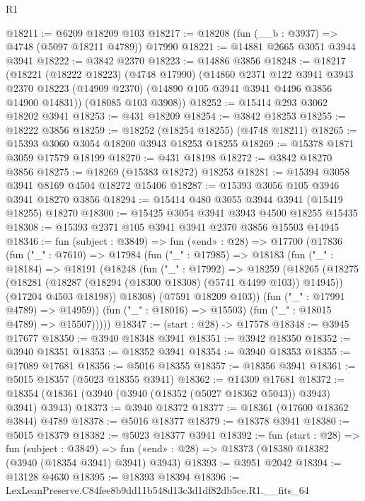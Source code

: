 \begin{lexlean}{R1}
\begin{coremodule}
@18211 := @6209 @18209 @103
@18217 := @18208 (fun (__b : @3937) => @4748 (@5097 @18211 @4789)) @17990
@18221 := @14881 @2665 @3051 @3944 @3941
@18222 := @3842 @2370
@18223 := @14886 @3856
@18248 := @18217
    (@18221
      (@18222 @18223)
      (@4748 @17990)
      (@14860
        @2371
        @122
        @3941
        @3943
        @2370
        @18223
        (@14909 @2370)
        (@14890 @105 @3941 @3941 @4496 @3856 @14900 @14831))
      (@18085 @103 @3908))
@18252 := @15414 @293 @3062 @18202 @3941
@18253 := @431 @18209
@18254 := @3842 @18253
@18255 := @18222 @3856
@18259 := @18252 (@18254 @18255) (@4748 @18211)
@18265 := @15393 @3060 @3054 @18200 @3943 @18253 @18255
@18269 := @15378 @1871 @3059 @17579 @18199
@18270 := @431 @18198
@18272 := @3842 @18270 @3856
@18275 := @18269 (@15383 @18272) @18253
@18281 := @15394 @3058 @3941 @8169 @4504 @18272 @15406
@18287 := @15393 @3056 @105 @3946 @3941 @18270 @3856
@18294 := @15414 @480 @3055 @3944 @3941 (@15419 @18255) @18270
@18300 := @15425 @3054 @3941 @3943 @4500 @18255 @15435
@18308 := @15393 @2371 @105 @3941 @3941 @2370 @3856 @15503 @14945
@18346 := fun (subject : @3849) =>
  fun («end» : @28) =>
  @17700
    (@17836
      (fun ("_" : @7610) =>
      @17984
        (fun ("_" : @17985) =>
        @18183
          (fun ("_" : @18184) =>
          @18191
            (@18248
              (fun ("_" : @17992) =>
              @18259
                (@18265
                  (@18275
                    (@18281 (@18287 (@18294 (@18300 @18308) (@5741 @4499 @103)) @14945))
                    (@17204 @4503 @18198))
                  @18308)
                (@7591 @18209 @103))
              (fun ("_" : @17991 @4789) => @14959))
            (fun ("_" : @18016) => @15503)
            (fun ("_" : @18015 @4789) => @15507)))))
@18347 := (start : @28) -> @17578
@18348 := @3945 @17677
@18350 := @3940 @18348 @3941
@18351 := @3942 @18350
@18352 := @3940 @18351
@18353 := @18352 @3941
@18354 := @3940 @18353
@18355 := @17089 @17681
@18356 := @5016 @18355
@18357 := @18356 @3941
@18361 := @5015 @18357 (@5023 @18355 @3941)
@18362 := @14309 @17681
@18372 := @18354 (@18361 (@3940 (@3940 (@18352 (@5027 @18362 @5043)) @3943) @3941) @3943)
@18373 := @3940 @18372
@18377 := @18361 (@17600 @18362 @3844) @4789
@18378 := @5016 @18377
@18379 := @18378 @3941
@18380 := @5015 @18379
@18382 := @5023 @18377 @3941
@18392 := fun (start : @28) =>
  fun (subject : @3849) =>
  fun («end» : @28) => @18373 (@18380 @18382 (@3940 (@18354 @3941) @3941) @3943)
@18393 := @3951 @2042
@18394 := @13128 @4630
@18395 := @18393 @18394
@18396 := LexLeanPreserve.C84fee8b9dd11b548d13c3d1df82db5ce.R1.__fits_64

\end{coremodule}
\end{lexlean}
